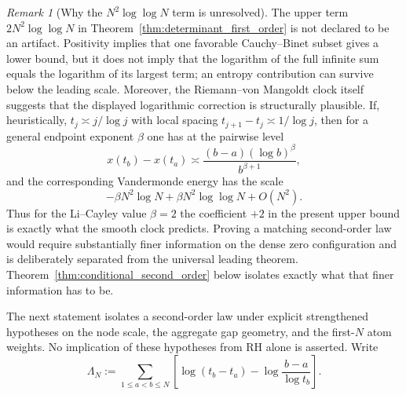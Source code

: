 \documentclass[11pt]{amsart}
\numberwithin{equation}{section}
\theoremstyle{plain}
\theoremstyle{definition}
\theoremstyle{remark}
\newtheorem{remark}[theorem]{Remark}
\newcommand{\RH}{\mathrm{RH}}
\begin{document}
\begin{remark}[Why the $N^2\log\log N$ term is unresolved]
\label{rem:second_order_not_artifact}
The upper term $2N^2\log\log N$ in Theorem~\ref{thm:determinant_first_order} is not declared to be an artifact. Positivity implies that one favorable Cauchy--Binet subset gives a lower bound, but it does not imply that the logarithm of the full infinite sum equals the logarithm of its largest term; an entropy contribution can survive below the leading scale. Moreover, the Riemann--von Mangoldt clock itself suggests that the displayed logarithmic correction is structurally plausible. If, heuristically, $t_j\asymp j/\log j$ with local spacing $t_{j+1}-t_j\asymp1/\log j$, then for a general endpoint exponent $\beta$ one has at the pairwise level
\begin{equation}
x(t_b)-x(t_a)
\asymp
\frac{(b-a)(\log b)^{\beta}}{b^{\beta+1}},
\label{eq:clock_gap_second_order}
\end{equation}
and the corresponding Vandermonde energy has the scale
\begin{equation}
-\beta N^2\log N
+\beta N^2\log\log N
+O(N^2).
\label{eq:clock_vandermonde_second_order}
\end{equation}
Thus for the Li--Cayley value $\beta=2$ the coefficient $+2$ in the present upper bound is exactly what the smooth clock predicts. Proving a matching second-order law would require substantially finer information on the dense zero configuration and is deliberately separated from the universal leading theorem. Theorem~\ref{thm:conditional_second_order} below isolates exactly what that finer information has to be.
\end{remark}

The next statement isolates a second-order law under explicit strengthened hypotheses on the node scale, the aggregate gap geometry, and the first-$N$ atom weights.  No implication of these hypotheses from $\RH$ alone is asserted. Write
\begin{equation}
\Lambda_N:=
\sum_{1\le a<b\le N}
\left[
\log(t_b-t_a)-\log\frac{b-a}{\log t_b}
\right].
\label{eq:gap_regularity_functional}
\end{equation}
\end{document}
